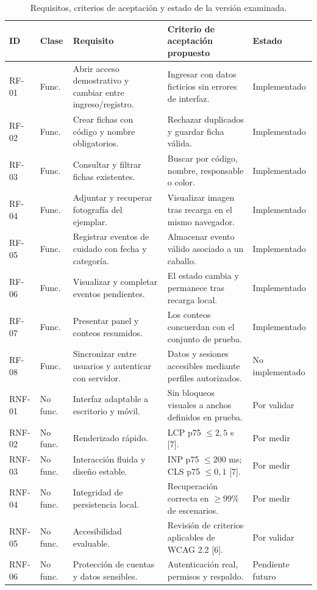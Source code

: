 \documentclass[conference,10pt]{IEEEtran}
\begin{document}
\begin{table}[!t]
\caption{Requisitos, criterios de aceptación y estado de la versión examinada.}
\label{tab:req}
\centering\footnotesize
\begin{tabularx}{\textwidth}{@{}p{1cm}p{1cm}Y p{5.9cm} p{1.6cm}@{}}\toprule
\textbf{ID}&\textbf{Clase}&\textbf{Requisito}&\textbf{Criterio de aceptación propuesto}&\textbf{Estado}\tabularnewline\midrule
RF-01&Func.&Abrir acceso demostrativo y cambiar entre ingreso/registro.&Ingresar con datos ficticios sin errores de interfaz.&Implementado\tabularnewline
RF-02&Func.&Crear fichas con código y nombre obligatorios.&Rechazar duplicados y guardar ficha válida.&Implementado\tabularnewline
RF-03&Func.&Consultar y filtrar fichas existentes.&Buscar por código, nombre, responsable o color.&Implementado\tabularnewline
RF-04&Func.&Adjuntar y recuperar fotografía del ejemplar.&Visualizar imagen tras recarga en el mismo navegador.&Implementado\tabularnewline
RF-05&Func.&Registrar eventos de cuidado con fecha y categoría.&Almacenar evento válido asociado a un caballo.&Implementado\tabularnewline
RF-06&Func.&Visualizar y completar eventos pendientes.&El estado cambia y permanece tras recarga local.&Implementado\tabularnewline
RF-07&Func.&Presentar panel y conteos resumidos.&Los conteos concuerdan con el conjunto de prueba.&Implementado\tabularnewline
RF-08&Func.&Sincronizar entre usuarios y autenticar con servidor.&Datos y sesiones accesibles mediante perfiles autorizados.&No implementado\tabularnewline\midrule
RNF-01&No func.&Interfaz adaptable a escritorio y móvil.&Sin bloqueos visuales a anchos definidos en prueba.&Por validar\tabularnewline
RNF-02&No func.&Renderizado rápido.&LCP p75 $\leq 2{,}5$ s [7].&Por medir\tabularnewline
RNF-03&No func.&Interacción fluida y diseño estable.&INP p75 $\leq 200$ ms; CLS p75 $\leq 0{,}1$ [7].&Por medir\tabularnewline
RNF-04&No func.&Integridad de persistencia local.&Recuperación correcta en $\geq99\%$ de escenarios.&Por medir\tabularnewline
RNF-05&No func.&Accesibilidad evaluable.&Revisión de criterios aplicables de WCAG 2.2 [6].&Por validar\tabularnewline
RNF-06&No func.&Protección de cuentas y datos sensibles.&Autenticación real, permisos y respaldo.&Pendiente futuro\tabularnewline\bottomrule
\end{tabularx}
\end{table}
\end{document}
